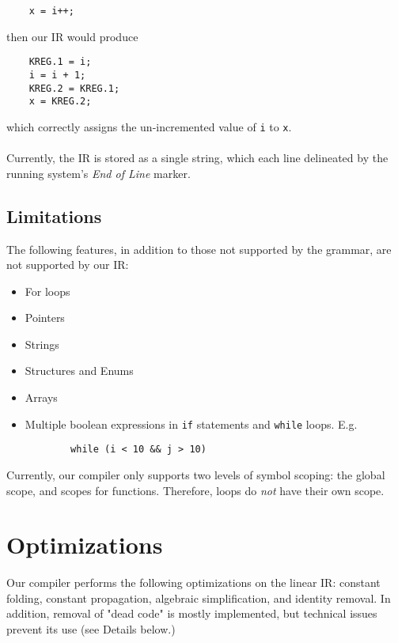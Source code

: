 \documentclass{scrartcl}
\begin{document}
\begin{verbatim}
    x = i++;
\end{verbatim}
then our IR would produce
\begin{verbatim}
    KREG.1 = i;
    i = i + 1;
    KREG.2 = KREG.1;
    x = KREG.2;
\end{verbatim}
which correctly assigns the un-incremented value of \verb|i| to \verb|x|.\\
\\
Currently, the IR is stored as a single string, which each line delineated by the running system's \textit{End of Line} marker. 

\subsection{Limitations}
The following features, in addition to those not supported by the grammar, are not supported by our IR:
\begin{itemize}
    \item For loops
    \item Pointers
    \item Strings
    \item Structures and Enums
    \item Arrays
    \item Multiple boolean expressions in \verb|if| statements and \verb|while| loops. E.g. 
    \begin{verbatim}
        while (i < 10 && j > 10)
    \end{verbatim}
\end{itemize}
Currently, our compiler only supports two levels of symbol scoping: the global scope, and scopes for functions. Therefore, loops do \textit{not} have their own scope.

\section{Optimizations}
Our compiler performs the following optimizations on the linear IR: constant folding, constant propagation, algebraic simplification, and identity removal. In addition, removal of "dead code" is mostly implemented, but technical issues prevent its use (see Details below.)
\end{document}
